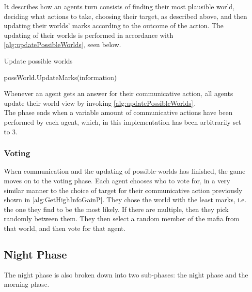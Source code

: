 \setcounter{algorithmcaption}{5}
It describes how an agents turn consists of finding their most plausible world,
deciding what actions to take, choosing their target, as described above, and
then updating their worlds' marks according to the outcome of the action.
The updating of their worlds is performed in accordance with
\cref{alg:updatePossibleWorlds}, seen below.
\begin{algorithm}[H]
	\caption{Update possible worlds}
	\begin{algorithmic}[1]
		\State possWorld.UpdateMarks(information)
		\EndFor
		\EndFor
		\EndFunction
	\end{algorithmic}\label{alg:updatePossibleWorlds}
\end{algorithm}
\setcounter{algorithmcaption}{6}
Whenever an agent gets an answer for their communicative action, all agents update their
world view by invoking \cref{alg:updatePossibleWorlds}.\\

The phase ends when a variable amount of communicative actions have been
performed by each agent, which, in this implementation has been arbitrarily set
to 3.

\subsubsection{Voting}\label{sec:voting}
When communication and the updating of possible-worlds has finished, the game
moves on to the voting phase. Each agent chooses who to vote for, in a very
similar manner to the choice of target for their communicative action
previously shown in \cref{alg:GetHighInfoGainP}. They chose the world with the
least marks, i.e. the one they find to be the most likely. If there are
multiple, then they pick randomly between them. They then select a random
member of the mafia from that world, and then vote for that agent.

\subsection{Night Phase}\label{sec:nightPhase}
The night phase is also broken down into two sub-phases: the night phase and
the morning phase.

